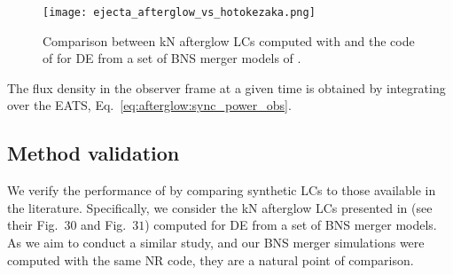 \begin{figure}[t]
    \centering 
    \texttt{[image: ejecta\_afterglow\_vs\_hotokezaka.png]}
    \caption{
        Comparison between \ac{kN} afterglow \acp{LC} computed with 
        \pyblast{} and the code of \citet{Hotokezaka:2015eja} for \ac{DE}
        from a set of \ac{BNS} merger models of \citet{Radice:2018pdn}. 
    } 
    \label{fig:afg_test}
\end{figure}

%
%

The flux density in the observer frame at a given time 
is obtained by integrating over the \ac{EATS}, 
Eq.~\eqref{eq:afterglow:sync_power_obs}. 





\subsection{Method validation}

We verify the performance of \pyblast{} by comparing synthetic \acp{LC} to 
those available in the literature. Specifically, we consider the \ac{kN} afterglow 
\acp{LC} presented in \citet{Radice:2018pdn} (see their Fig.~$30$ and Fig.~$31$) 
computed for \ac{DE} from a set of \ac{BNS} merger models. As we aim to conduct a 
similar study, and our \ac{BNS} merger simulations were computed with the same 
\ac{NR} code, they are a natural point of comparison. 
%

